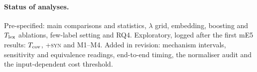 \paragraph{Status of analyses.}
Pre-specified: main comparisons and statistics, $\lambda$ grid, embedding, boosting and $T_{\rm lex}$ ablations, few-label setting and RQ4. Exploratory, logged after the first mE5 results: $T_{\rm cov}$, \textsc{+syn} and M1--M4. Added in revision: mechanism intervals, sensitivity and equivalence readings, end-to-end timing, the normaliser audit and the input-dependent cost threshold.
